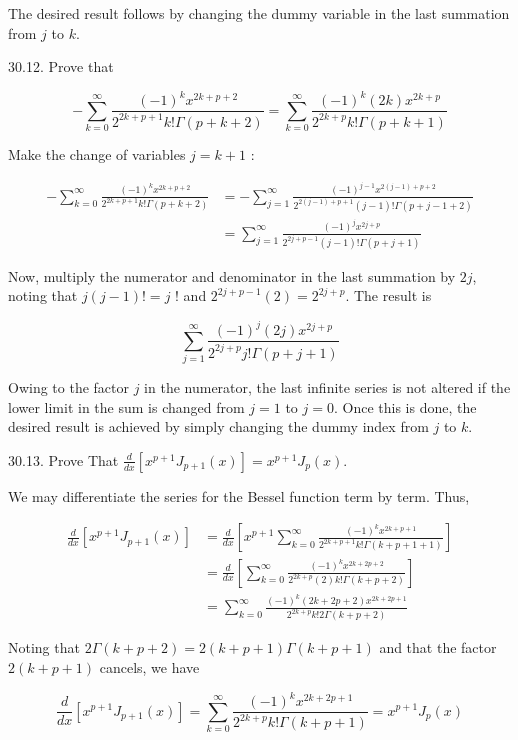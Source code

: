 \documentclass[10pt]{article}
\begin{document}
The desired result follows by changing the dummy variable in the last summation from $j$ to $k$.

30.12. Prove that

$$
-\sum_{k=0}^{\infty} \frac{(-1)^{k} x^{2 k+p+2}}{2^{2 k+p+1} k ! \Gamma(p+k+2)}=\sum_{k=0}^{\infty} \frac{(-1)^{k}(2 k) x^{2 k+p}}{2^{2 k+p} k ! \Gamma(p+k+1)}
$$

Make the change of variables $j=k+1$ :

$$
\begin{aligned}
-\sum_{k=0}^{\infty} \frac{(-1)^{k} x^{2 k+p+2}}{2^{2 k+p+1} k ! \Gamma(p+k+2)} & =-\sum_{j=1}^{\infty} \frac{(-1)^{j-1} x^{2(j-1)+p+2}}{2^{2(j-1)+p+1}(j-1) ! \Gamma(p+j-1+2)} \\
& =\sum_{j=1}^{\infty} \frac{(-1)^{j} x^{2 j+p}}{2^{2 j+p-1}(j-1) ! \Gamma(p+j+1)}
\end{aligned}
$$

Now, multiply the numerator and denominator in the last summation by $2 j$, noting that $j(j-1) !=j$ ! and $2^{2 j+p-1}(2)=2^{2 j+p}$. The result is

$$
\sum_{j=1}^{\infty} \frac{(-1)^{j}(2 j) x^{2 j+p}}{2^{2 j+p} j ! \Gamma(p+j+1)}
$$

Owing to the factor $j$ in the numerator, the last infinite series is not altered if the lower limit in the sum is changed from $j=1$ to $j=0$. Once this is done, the desired result is achieved by simply changing the dummy index from $j$ to $k$.

30.13. Prove That $\frac{d}{d x}\left[x^{p+1} J_{p+1}(x)\right]=x^{p+1} J_{p}(x)$.

We may differentiate the series for the Bessel function term by term. Thus,

$$
\begin{aligned}
\frac{d}{d x}\left[x^{p+1} J_{p+1}(x)\right] & =\frac{d}{d x}\left[x^{p+1} \sum_{k=0}^{\infty} \frac{(-1)^{k} x^{2 k+p+1}}{2^{2 k+p+1} k ! \Gamma(k+p+1+1)}\right] \\
& =\frac{d}{d x}\left[\sum_{k=0}^{\infty} \frac{(-1)^{k} x^{2 k+2 p+2}}{2^{2 k+p}(2) k ! \Gamma(k+p+2)}\right] \\
& =\sum_{k=0}^{\infty} \frac{(-1)^{k}(2 k+2 p+2) x^{2 k+2 p+1}}{2^{2 k+p} k ! 2 \Gamma(k+p+2)}
\end{aligned}
$$

Noting that $2 \Gamma(k+p+2)=2(k+p+1) \Gamma(k+p+1)$ and that the factor $2(k+p+1)$ cancels, we have

$$
\frac{d}{d x}\left[x^{p+1} J_{p+1}(x)\right]=\sum_{k=0}^{\infty} \frac{(-1)^{k} x^{2 k+2 p+1}}{2^{2 k+p} k ! \Gamma(k+p+1)}=x^{p+1} J_{p}(x)
$$
\end{document}
